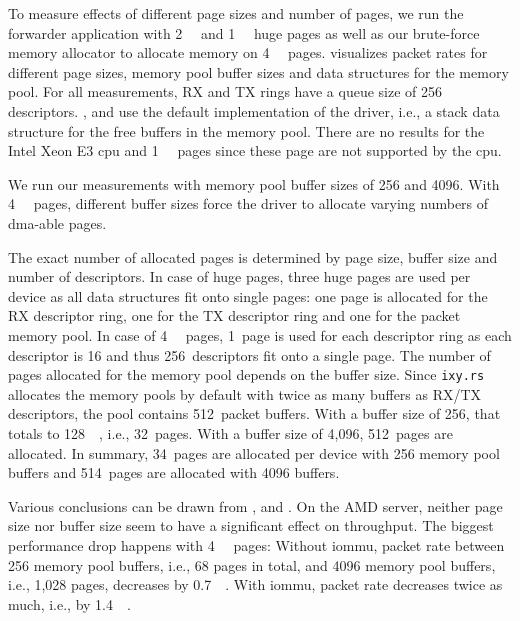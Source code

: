 To measure effects of different page sizes and number of pages, we run the
forwarder application with \SI{2}{\mebi\byte} and \SI{1}{\gibi\byte} huge pages
as well as our brute-force memory allocator to allocate memory on
\SI{4}{\kibi\byte} pages.  visualizes packet
rates for different page sizes, memory pool buffer sizes and data structures for
the memory pool. For all measurements, RX and TX rings have a queue size of 256
descriptors. ,
 and  use
the default implementation of the driver, i.e., a stack data structure for the
free buffers in the memory pool. There are no results for the Intel Xeon E3
\ac{cpu} and \SI{1}{\gibi\byte} pages since these page are not supported by the
\ac{cpu}.

We run our measurements with memory pool buffer sizes of \SI{256}{\byte} and
\SI{4096}{\byte}. With \SI{4}{\kibi\byte} pages, different buffer sizes force
the driver to allocate varying numbers of \ac{dma}-able pages.

The exact number of allocated pages is determined by page size, buffer size and
number of descriptors. In case of huge pages, three huge pages are used per
device as all data structures fit onto single pages: one page is allocated for
the RX descriptor ring, one for the TX descriptor ring and one for the packet
memory pool. In case of \SI{4}{\kibi\byte} pages, 1~page is used for each
descriptor ring as each descriptor is \SI{16}{\byte} and thus 256~descriptors
fit onto a single page. The number of pages allocated for the memory pool
depends on the buffer size. Since \texttt{ixy.rs} allocates the memory pools by
default with twice as many buffers as RX/TX descriptors, the pool contains
512~packet buffers. With a buffer size of \SI{256}{\byte}, that totals to
\SI{128}{\kibi\byte}, i.e., 32~pages. With a buffer size of 4,096, 512~pages are
allocated. In summary, 34~pages are allocated per device with \SI{256}{\byte}
memory pool buffers and 514~pages are allocated with \SI{4096}{\byte} buffers.

Various conclusions can be drawn from ,
 and . On
the AMD server, neither page size nor buffer size seem to have a significant
effect on throughput. The biggest performance drop happens with
\SI{4}{\kibi\byte} pages: Without \ac{iommu}, packet rate between
\SI{256}{\byte} memory pool buffers, i.e., 68 pages in total, and
\SI{4096}{\byte} memory pool buffers, i.e., 1,028 pages, decreases by
\SI{0.7}{\mega\pps}. With \ac{iommu}, packet rate decreases twice as much, i.e.,
by \SI{1.4}{\mega\pps}.


